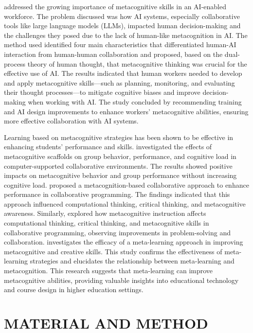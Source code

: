 \documentclass[a4paper,twoside]{article}
\begin{document}
\cite{Sidra24} addressed the growing importance of metacognitive skills in an
AI-enabled workforce. The problem discussed was how AI systems, especially
collaborative tools like large language models (LLMs), impacted human
decision-making and the challenges they posed due to the lack of human-like
metacognition in AI. The method used identified four main characteristics that
differentiated human-AI interaction from human-human collaboration and proposed,
based on the dual-process theory of human thought, that metacognitive thinking
was crucial for the effective use of AI. The results indicated that human
workers needed to develop and apply metacognitive skills—such as planning,
monitoring, and evaluating their thought processes—to mitigate cognitive biases
and improve decision-making when working with AI. The study concluded by
recommending training and AI design improvements to enhance workers’
metacognitive abilities, ensuring more effective collaboration with AI systems.

Learning based on metacognitive strategies has been shown to be effective in
enhancing students’ performance and skills. \cite{Zheng19} investigated the
effects of metacognitive scaffolds on group behavior, performance, and cognitive
load in computer-supported collaborative environments. The results showed
positive impacts on metacognitive behavior and group performance without
increasing cognitive load. \cite{LiWei23} proposed a metacognition-based
collaborative approach to enhance performance in collaborative programming. The
findings indicated that this approach influenced computational thinking,
critical thinking, and metacognitive awareness. Similarly, \cite{Wang23}
explored how metacognitive instruction affects computational thinking, critical
thinking, and metacognitive skills in collaborative programming, observing
improvements in problem-solving and collaboration. \cite{Khusnul24} investigates
the efficacy of a meta-learning approach in improving metacognitive and creative
skills. This study confirms the effectiveness of meta-learning strategies and
elucidates the relationship between meta-learning and metacognition. This
research suggests that meta-learning can improve metacognitive abilities,
providing valuable insights into educational technology and course design in
higher education settings.


\section{\uppercase{Material and Method}}
\end{document}

